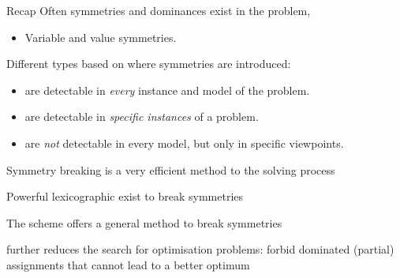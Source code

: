\documentclass{cons-beamer}
\begin{document}
\begin{frame}{Recap}
  Often symmetries and dominances exist in the problem, 
  \begin{itemize}
    \item Variable and value symmetries.
  \end{itemize}
  \vfill

  Different types based on where symmetries are introduced:
  \begin{itemize}
    \item {} are
      detectable in \emph{every} instance and model of the problem.
    \item {} are
      detectable in \emph{specific instances} of a problem. \\
    \item {} are \emph{not}
      detectable in every model, but only in specific viewpoints.
  \end{itemize}
  \vfill

  Symmetry breaking is a very efficient method to  the solving process
  \vfill

  Powerful lexicographic  exist to break symmetries
  \vfill

  The  scheme offers a general method to break symmetries
  \vfill

   further reduces the search for optimisation problems: forbid dominated (partial) assignments that cannot lead to a better optimum
\end{frame}
%
%
%
\end{document}
